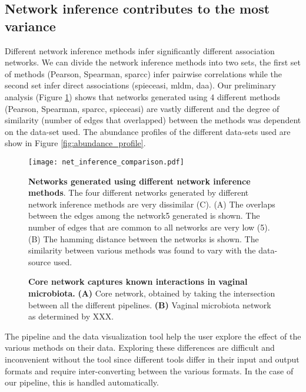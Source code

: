   \subsection*{Network inference contributes to the most variance}

  Different network inference methods infer significantly different association networks.
  We can divide the network inference methods into two sets, the first set of methods (Pearson, Spearman, \ac{sparcc}) infer pairwise correlations while the second set infer direct associations (\ac{spieceasi}, \ac{mldm}, \ac{daa}).
  Our preliminary analysis (Figure \ref{fig:network_comparison}) shows that networks generated using 4 different methods (Pearson, Spearman, \ac{sparcc}, \ac{spieceasi}) are vastly different and the degree of similarity (number of edges that overlapped) between the methods was dependent on the data-set used.
  The abundance profiles of the different data-sets used are show in Figure \ref{fig:abundance_profile}.

  \begin{figure}[h]
    \centering
    \texttt{[image: net\_inference\_comparison.pdf]}
    \caption{
      \textbf{Networks generated using different network inference methods}.
      The four different networks generated by different network inference methods are very dissimilar (C).
      (A) The overlaps between the edges among the network5 generated is shown. The number of edges that are common to all networks are very low (5).
      (B) The hamming distance between the networks is shown. The similarity between various methods was found to vary with the data-source used.
    }
    \label{fig:network_comparison}
  \end{figure}

  \begin{figure}[h]
    \centering
    \caption{\textbf{Core network captures known interactions in vaginal microbiota.} \textbf{(A)} Core network, obtained by taking the intersection between all the different pipelines. \textbf{(B)} Vaginal microbiota network as determined by XXX.}
    \label{fig:real_network}
  \end{figure}

  The pipeline and the data visualization tool help the user explore the effect of the various methods on their data.
  Exploring these differences are difficult and inconvenient without the tool since different tools differ in their input and output formats and require inter-converting between the various formats.
  In the case of our pipeline, this is handled automatically.
